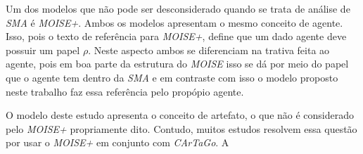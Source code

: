 Um dos modelos que não pode ser desconsiderado quando se trata de análise de \textit{SMA} é \textit{MOISE+}. Ambos os modelos apresentam o mesmo conceito
de agente. Isso, pois o texto de referência para \textit{MOISE+}, \cite{moiseframework} define que um dado agente deve possuir um papel $\rho$. Neste 
aspecto ambos se diferenciam na trativa feita ao agente, pois em boa parte da estrutura do \textit{MOISE} isso se dá por meio do papel que o agente 
tem dentro da \textit{SMA}  e em contraste com isso o modelo proposto neste trabalho faz essa referência pelo propópio agente. 

O modelo deste estudo apresenta o conceito de artefato, o que não é considerado pelo \textit{MOISE+} propriamente dito. Contudo, muitos estudos resolvem
essa questão por usar o \textit{MOISE+} em conjunto com \textit{CArTaGo}. A